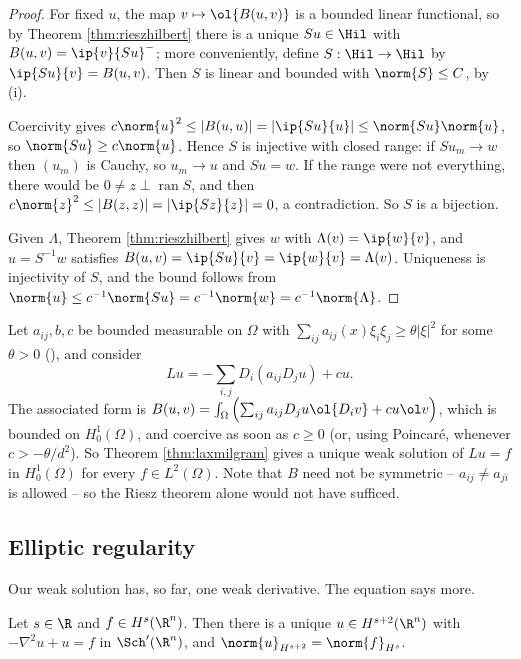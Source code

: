 \begin{proof}
	For fixed $u$, the map $v \mapsto \ol{B(u,v)}$ is a bounded linear functional, so by Theorem \ref{thm:rieszhilbert} there is a unique $Su \in \Hil$ with $B(u,v)=\ip{v}{Su}^-$; more conveniently, define $S : \Hil \to \Hil$ by $\ip{Su}{v}=B(u,v)$. Then $S$ is linear and bounded with $\norm{S}\le C$, by (i).

	Coercivity gives $c\norm{u}^2\le|B(u,u)|=|\ip{Su}{u}|\le\norm{Su}\norm{u}$, so $\norm{Su}\ge c\norm{u}$. Hence $S$ is injective with closed range: if $Su_m \to w$ then $(u_m)$ is Cauchy, so $u_m \to u$ and $Su = w$. If the range were not everything, there would be $0 \ne z \perp \operatorname{ran}S$, and then $c\norm{z}^2\le|B(z,z)|=|\ip{Sz}{z}|=0$, a contradiction. So $S$ is a bijection.

	Given $\Lambda$, Theorem \ref{thm:rieszhilbert} gives $w$ with $\Lambda(v)=\ip{w}{v}$, and $u = S^{-1}w$ satisfies $B(u,v)=\ip{Su}{v}=\ip{w}{v}=\Lambda(v)$. Uniqueness is injectivity of $S$, and the bound follows from $\norm{u}\le c^{-1}\norm{Su}=c^{-1}\norm{w}=c^{-1}\norm{\Lambda}$.
\end{proof}

\begin{example}
	Let $a_{ij},b,c$ be bounded measurable on $\Omega$ with $\sum_{ij}a_{ij}(x)\xi_i\xi_j\ge\theta|\xi|^2$ for some $\theta>0$ (), and consider
	$$Lu = -\sum_{i,j}D_i(a_{ij}D_ju)+cu.$$
	The associated form is $B(u,v)=\int_\Omega\left(\sum_{ij}a_{ij}D_ju\ol{D_iv}+cu\ol v\right)$, which is bounded on $H_0^1(\Omega)$, and coercive as soon as $c \ge 0$ (or, using Poincar\'e, whenever $c > -\theta/d^2$). So Theorem \ref{thm:laxmilgram} gives a unique weak solution of $Lu = f$ in $H_0^1(\Omega)$ for every $f \in L^2(\Omega)$. Note that $B$ need not be symmetric -- $a_{ij}\ne a_{ji}$ is allowed -- so the Riesz theorem alone would not have sufficed.
\end{example}

\subsection{Elliptic regularity}

Our weak solution has, so far, one weak derivative. The equation says more.

\begin{proposition}\label{prop:regularityRn}
	Let $s \in \R$ and $f \in H^s(\R^n)$. Then there is a unique $u \in H^{s+2}(\R^n)$ with $-\nabla^2u+u=f$ in $\Sch'(\R^n)$, and $\norm{u}_{H^{s+2}}=\norm{f}_{H^s}$.
\end{proposition}

